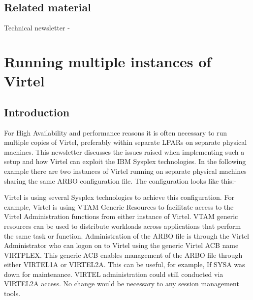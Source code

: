 \documentclass[letterpaper,10pt,english]{sphinxmanual}
\begin{document}
\newpage

\ignorespaces 

\section{Related material}
\label{\detokenize{connectivity_guide:related-material}}\label{\detokenize{connectivity_guide:index-168}}
Technical newsletter - 

\ignorespaces 

\chapter{Running multiple instances of Virtel}
\label{\detokenize{connectivity_guide:running-multiple-instances-of-virtel}}\label{\detokenize{connectivity_guide:index-169}}

\section{Introduction}
\label{\detokenize{connectivity_guide:id75}}
For High Availability and performance reasons it is often necessary to run multiple copies of Virtel, preferably within separate LPARs on separate physical machines. This newsletter discusses the issues raised when implementing such a setup and how Virtel can exploit the IBM Sysplex technologies. In the following example there are two instances of Virtel running on separate physical machines sharing the same ARBO configuration file. The configuration looks like this:-


Virtel is using several Sysplex technologies to achieve this configuration. For example, Virtel is using VTAM Generic Resources to facilitate access to the Virtel Administration functions from either instance of Virtel. VTAM generic resources can be used to distribute workloads across applications that perform the same task or function. Administration of the ARBO file is through the Virtel Administrator who can logon on to Virtel using the generic Virtel ACB name VIRTPLEX. This generic ACB enables management of the ARBO file through either VIRTEL1A or VIRTEL2A. This can be useful, for example, If SYSA was down for maintenance. VIRTEL administration could still conducted via VIRTEL2A access. No change would be necessary to any session management tools.
\end{document}
